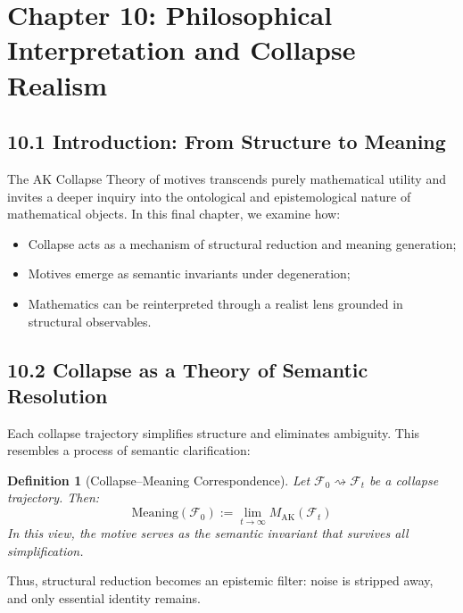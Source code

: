 \documentclass[11pt]{article}
\newtheorem{definition}[theorem]{Definition}
\begin{document}

\section{Chapter 10: Philosophical Interpretation and Collapse Realism}

\subsection{10.1 Introduction: From Structure to Meaning}

The AK Collapse Theory of motives transcends purely mathematical utility and invites a deeper inquiry into the ontological and epistemological nature of mathematical objects. In this final chapter, we examine how:

\begin{itemize}
    \item Collapse acts as a mechanism of structural reduction and meaning generation;
    \item Motives emerge as semantic invariants under degeneration;
    \item Mathematics can be reinterpreted through a realist lens grounded in structural observables.
\end{itemize}

\subsection{10.2 Collapse as a Theory of Semantic Resolution}

Each collapse trajectory simplifies structure and eliminates ambiguity. This resembles a process of semantic clarification:

\begin{definition}[Collapse–Meaning Correspondence]
Let $\mathcal{F}_0 \rightsquigarrow \mathcal{F}_t$ be a collapse trajectory. Then:
\[
\text{Meaning}(\mathcal{F}_0) := \lim_{t \to \infty} M_{\mathrm{AK}}(\mathcal{F}_t)
\]
In this view, the motive serves as the semantic invariant that survives all simplification.
\end{definition}

Thus, structural reduction becomes an epistemic filter: noise is stripped away, and only essential identity remains.
\end{document}

